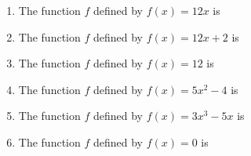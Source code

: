 \documentclass{ximera}
\author{Kenneth Berglund}
\begin{document}
\begin{exercise}
\begin{enumerate}
\item The function $f$ defined by $f(x) = 12x$ is
\begin{multipleChoice}
\end{multipleChoice}

\item The function $f$ defined by $f(x) = 12x + 2$ is
\begin{multipleChoice}
\end{multipleChoice}

\item The function $f$ defined by $f(x) = 12$ is
\begin{multipleChoice}
\end{multipleChoice}

\item The function $f$ defined by $f(x) = 5x^2 - 4$ is
\begin{multipleChoice}
\end{multipleChoice}

\item The function $f$ defined by $f(x) = 3x^3 - 5x$ is
\begin{multipleChoice}
\end{multipleChoice}

\item The function $f$ defined by $f(x) = 0$ is
\begin{multipleChoice}
\end{multipleChoice}

\end{enumerate}
\end{exercise}
\end{document}

